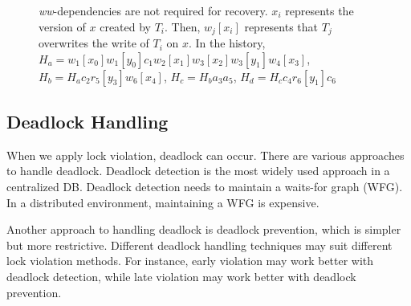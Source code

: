 \documentclass[conference]{IEEEtran}
\begin{document}
\begin{figure}[tbp]
  \caption{\emph{ww}-dependencies are not required for recovery.
  ${x_i}$ represents the version of $x$ created by ${T_i}$.
 Then, $w_j[x_i]$ represents that ${T_j}$ overwrites the write of ${T_i}$ on $x$. In the history, ${H_a = w_1[x_0]w_1[y_0]c_1w_2[x_1]w_3[x_2]w_3[y_1]w_4[x_3]}$, 
 ${H_b = H_a c_2r_5[y_3]w_6[x_4]}$,
 ${H_c = H_b a_3a_5}$, 
 ${H_d = H_c c_4r_6[y_1]c_6}$
}
\label{fig:versions_example}
\end{figure}


\subsection {Deadlock Handling}
\label{sec:deadlock_handling}
When we apply lock violation, deadlock can occur.
There are various approaches to handle deadlock.
Deadlock detection is the most widely used approach in a centralized DB.
Deadlock detection needs to maintain a waits-for graph (WFG).
In a distributed environment, maintaining a WFG is expensive.


Another approach to handling deadlock is deadlock prevention, which is simpler but more restrictive.
Different deadlock handling techniques may suit different lock violation methods.
For instance, early violation may work better with deadlock detection, while late violation may work better with deadlock prevention.
\end{document}
